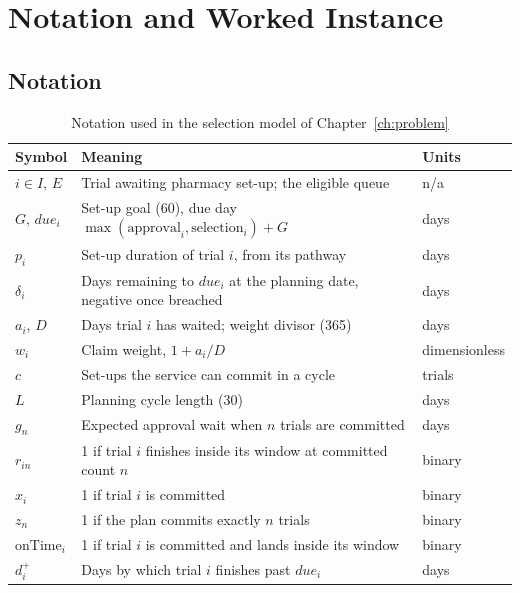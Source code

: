 
\chapter{Notation and Worked Instance}
\label{app:notation}

\section{Notation}
\label{sec:notation}

\begin{table}[htbp]
  \centering
  \caption{Notation used in the selection model of Chapter~\ref{ch:problem}}
  \label{tab:notation}
  \begin{tabularx}{\textwidth}{@{}lLl@{}}
    \toprule
    \textbf{Symbol} & \textbf{Meaning} & \textbf{Units} \\
    \midrule
    $i \in I$, $E$ & Trial awaiting pharmacy set-up; the eligible queue & n/a \\
    $G$, $due_i$ & Set-up goal (60), due day $\max(\mathrm{approval}_i, \mathrm{selection}_i) + G$ & days \\
    $p_i$ & Set-up duration of trial $i$, from its pathway & days \\
    $\delta_i$ & Days remaining to $due_i$ at the planning date, negative once breached & days \\
    $a_i$, $D$ & Days trial $i$ has waited; weight divisor (365) & days \\
    $w_i$ & Claim weight, $1 + a_i / D$ & dimensionless \\
    $c$ & Set-ups the service can commit in a cycle & trials \\
    $L$ & Planning cycle length (30) & days \\
    $g_n$ & Expected approval wait when $n$ trials are committed & days \\
    $r_{in}$ & 1 if trial $i$ finishes inside its window at committed count $n$ & binary \\
    $x_i$ & 1 if trial $i$ is committed & binary \\
    $z_n$ & 1 if the plan commits exactly $n$ trials & binary \\
    $\mathrm{onTime}_i$ & 1 if trial $i$ is committed and lands inside its window & binary \\
    $d^+_i$ & Days by which trial $i$ finishes past $due_i$ & days \\
    \bottomrule
  \end{tabularx}
\end{table}

